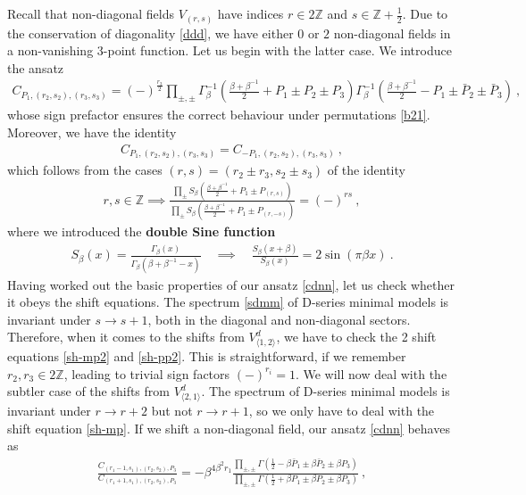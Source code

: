 \documentclass[12pt, a4paper]{article}
\newcommand{\myindex}[1]{\textbf{\boldmath #1}}
\theoremstyle{break}
\begin{document}
Recall that non-diagonal fields $V_{(r,s)}$ have indices $r\in 2\mathbb{Z}$ and $s\in\mathbb{Z}+\frac12$. 
Due to the conservation of diagonality \eqref{ddd}, we have either $0$ or $2$ non-diagonal fields in a non-vanishing 3-point function. Let us begin with the latter case. We introduce the ansatz 
\begin{align}
 \boxed{C_{P_1,(r_2,s_2),(r_3,s_3)} = (-)^{\frac{r_3}{2}}\prod_{\pm,\pm}
 \Gamma_\beta^{-1}\left(\tfrac{\beta+\beta^{-1}}{2}+P_1 \pm P_2\pm P_3\right) 
 \Gamma_\beta^{-1}\left(\tfrac{\beta+\beta^{-1}}{2}-P_1 \pm \bar P_2\pm \bar P_3\right)}\ ,
 \label{cdnn}
\end{align}
whose sign prefactor ensures the correct behaviour under permutations \eqref{b21}. Moreover, we have the identity
\begin{align}
 C_{P_1,(r_2,s_2),(r_3,s_3)}=C_{-P_1,(r_2,s_2),(r_3,s_3)} \ ,
 \label{cpcmp}
\end{align}
which follows from the cases $(r,s)=(r_2\pm r_3,s_2\pm s_3)$ of the identity 
\begin{align}
 r,s\in\mathbb{Z} \implies \frac{\prod_\pm S_\beta\left(\frac{\beta+\beta^{-1}}{2} +P_1 \pm P_{(r,s)}\right)}{\prod_\pm S_\beta\left(\frac{\beta+\beta^{-1}}{2} +P_1 \pm P_{(r,-s)}\right)} =(-)^{rs}\ ,
 \label{dsr}
\end{align}
where we introduced the \myindex{double Sine function}
\begin{align}
 S_\beta(x) = \frac{\Gamma_\beta(x)}{\Gamma_\beta(\beta + \beta^{-1}-x)}\quad \implies \quad \frac{S_\beta(x+\beta)}{S_\beta(x)} = 2\sin(\pi\beta x)\ .
 \label{sb}
\end{align}
Having worked out the basic properties of our ansatz \eqref{cdnn}, let us check whether it obeys the shift equations. The spectrum \eqref{sdmm} of D-series minimal models is invariant under $s\to s+1$, both in the diagonal and non-diagonal sectors. Therefore, when it comes to the shifts from $V^d_{\langle 1,2\rangle}$, we have to check the 2 shift equations \eqref{sh-mp2} and \eqref{sh-pp2}. This is straightforward, if we remember $r_2,r_3\in 2\mathbb{Z}$, leading to trivial sign factors $(-)^{r_i}=1$. We will now deal with the subtler case of the shifts from $V^d_{\langle 2,1\rangle}$. The spectrum of D-series minimal models is invariant under $r\to r+2$ but not $r\to r+1$, so we only have to deal with the shift equation \eqref{sh-mp}. If we shift a non-diagonal field, our ansatz \eqref{cdnn} behaves as 
\begin{align}
 \frac{C_{(r_1-1,s_1),(r_2,s_2),P_3}}{C_{(r_1+1,s_1),(r_2,s_2),P_3}} = - \beta^{4\beta^2r_1}\frac{\prod_{\pm,\pm} \Gamma(\frac12-\beta \bar P_1\pm \beta\bar P_2\pm \beta P_3)}{\prod_{\pm,\pm} \Gamma(\frac12+\beta P_1\pm \beta P_2\pm \beta P_3)}\ , 
\end{align}
\end{document}
